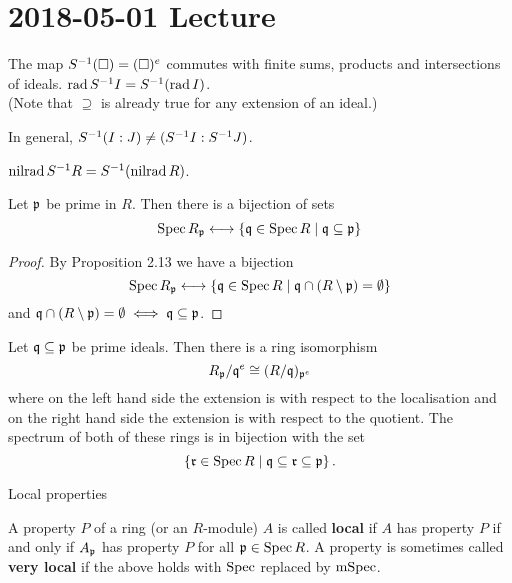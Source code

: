 \section{2018-05-01 Lecture}

\begin{lem}[2.14]
  \leavevmode
  \begin{enum}
    \io The map $S^{-1}(\square) = (\square)^e$ commutes with finite sums, products and intersections of ideals.
    \io $\operatorname{rad} S^{-1} I = S^{-1}(\operatorname{rad} I)$.\\
    (Note that $\supseteq$ is already true for any extension of an ideal.)
  \end{enum}
\end{lem}

\begin{rmk}
  In general, $S^{-1}(I:J) \neq (S^{-1} I: S^{-1} J)$.
\end{rmk}

\begin{cor}[2.15]
  $\operatorname{nilrad} S^{-1} R = S^{-1} (\operatorname{nilrad} R)$.
\end{cor}

\begin{cor}[2.16]
  Let $\mathfrak{p}$ be prime in $R$.
  Then there is a bijection of sets
  \[\operatorname{Spec} R_{\mathfrak{p}} \longleftrightarrow \left\{ \mathfrak{q} \in \operatorname{Spec} R \mid \mathfrak{q} \subseteq \mathfrak{p} \right\}\]
\end{cor}

\begin{proof}
  By Proposition 2.13 we have a bijection
  \[\operatorname{Spec} R_{\mathfrak{p}} \longleftrightarrow \left\{ \mathfrak{q} \in \operatorname{Spec} R \mid \mathfrak{q} \cap (R \setminus \mathfrak{p}) = \emptyset \right\}\]
  and $\mathfrak{q} \cap (R \setminus \mathfrak{p}) = \emptyset \iff \mathfrak{q} \subseteq \mathfrak{p}$.
\end{proof}

\begin{rmk}
  Let $\mathfrak{q} \subseteq \mathfrak{p}$ be prime ideals.
  Then there is a ring isomorphism
  \[R_{\mathfrak{p}}/\mathfrak{q}^e \cong (R/\mathfrak{q})_{\mathfrak{p}^e}\]
  where on the left hand side the extension is with respect to the localisation and on the right hand side the extension is with respect to the quotient.
  The spectrum of both of these rings is in bijection with the set
  \[ \left\{ \mathfrak{r} \in \operatorname{Spec} R \mid \mathfrak{q} \subseteq \mathfrak{r} \subseteq \mathfrak{p} \right\}.\]
\end{rmk}

Local properties

\begin{defn}
  A property $P$ of a ring (or an $R$-module) $A$ is called \textbf{local} if $A$ has property $P$ if and only if $A_{\mathfrak{p}}$ has property $P$ for all $\mathfrak{p} \in \operatorname{Spec} R$.
  A property is sometimes called \textbf{very local} if the above holds with $\operatorname{Spec}$ replaced by $\operatorname{mSpec}$.
\end{defn}

